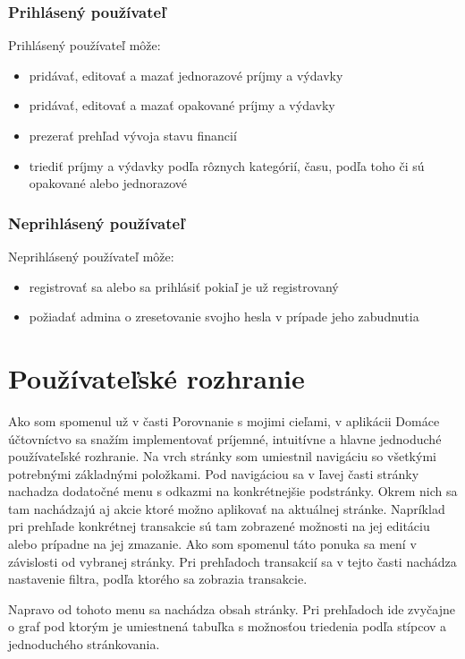 \documentclass[12pt,onesided]{book}
\begin{document}
\subsubsection{Prihlásený používateľ}
Prihlásený používateľ môže:
\begin{itemize}
\item{pridávať, editovať a mazať jednorazové príjmy a výdavky}
\item{pridávať, editovať a mazať opakované príjmy a výdavky}
\item{prezerať prehľad vývoja stavu financií}
\item{triediť príjmy a výdavky podľa rôznych kategórií, času, podľa toho či sú opakované alebo jednorazové}
\end{itemize}

\subsubsection{Neprihlásený používateľ}
Neprihlásený používateľ môže:
\begin{itemize}
\item{registrovať sa alebo sa prihlásiť pokiaľ je už registrovaný}
\item{požiadať admina o zresetovanie svojho hesla v prípade jeho zabudnutia}
\end{itemize}

\section{Používateľské rozhranie}
Ako som spomenul už v časti Porovnanie s mojimi cieľami, v aplikácii Domáce účtovníctvo sa snažím implementovať príjemné, intuitívne a hlavne jednoduché používateľské rozhranie. Na vrch stránky som umiestnil navigáciu so všetkými potrebnými základnými položkami. Pod navigáciou sa v ľavej časti stránky nachadza dodatočné menu s odkazmi na konkrétnejšie podstránky. Okrem nich sa tam nachádzajú aj akcie ktoré možno aplikovať na aktuálnej stránke. Napríklad pri prehľade konkrétnej transakcie sú tam zobrazené možnosti na jej editáciu alebo prípadne na jej zmazanie. Ako som spomenul táto ponuka sa mení v závislosti od vybranej stránky. Pri prehľadoch transakcií sa v tejto časti nachádza nastavenie filtra, podľa ktorého sa zobrazia transakcie.

Napravo od tohoto menu sa nachádza obsah stránky. Pri prehľadoch ide zvyčajne o graf pod ktorým je umiestnená tabuľka s možnosťou triedenia podľa stípcov a jednoduchého stránkovania.
\end{document}
